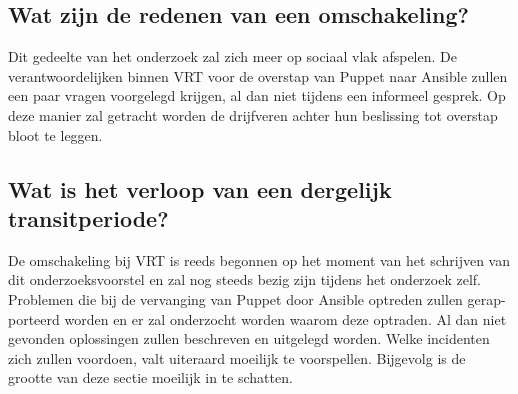 \subsection{Wat zijn de redenen van een omschakeling?}

Dit gedeelte van het onderzoek zal zich meer op sociaal vlak afspelen. De verantwoordelijken binnen VRT voor de overstap van Puppet naar Ansible zullen een paar vragen voorgelegd krijgen, al dan niet tijdens een informeel gesprek. Op deze manier zal getracht worden de drijfveren achter hun beslissing tot overstap bloot te leggen.

\subsection{Wat is het verloop van een dergelijk transitperiode?}

De omschakeling bij VRT is reeds begonnen op het moment van het schrijven van dit onderzoeksvoorstel en zal nog steeds bezig zijn tijdens het onderzoek zelf. Problemen die bij de vervanging van Puppet door Ansible optreden zullen gerap- porteerd worden en er zal onderzocht worden waarom deze optraden. Al dan niet gevonden oplossingen zullen beschreven en uitgelegd worden. Welke incidenten zich zullen voordoen, valt uiteraard moeilijk te voorspellen. Bijgevolg is de grootte van deze sectie moeilijk in te schatten.




